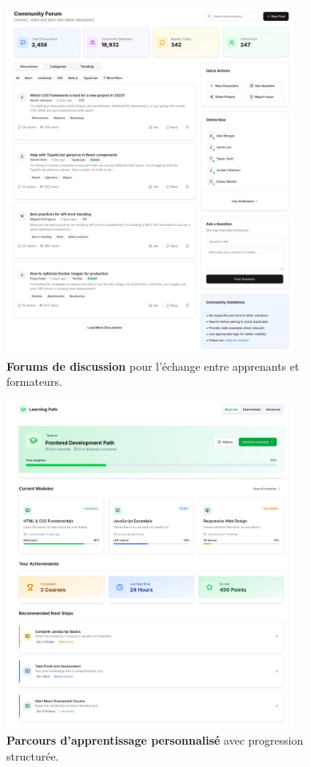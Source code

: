 \begin{figure}[h!]
  \centering
  \includegraphics[width=0.85\textwidth,keepaspectratio]{old-reports/week_4_img/froms.jpeg}
  \caption{\textbf{Forums de discussion} pour l'échange entre apprenants et formateurs.}
  \label{fig:community_forums}
\end{figure}

\begin{figure}[h!]
  \centering
  \includegraphics[width=0.85\textwidth,keepaspectratio]{old-reports/week_4_img/learnpath.jpeg}
  \caption{\textbf{Parcours d'apprentissage personnalisé} avec progression structurée.}
  \label{fig:learning_paths}
\end{figure}

